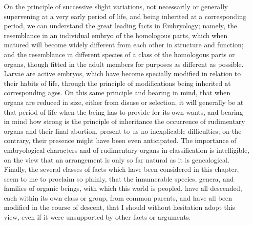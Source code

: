 \indent On the principle of successive slight variations, not necessarily or generally supervening at a very early period of life, and being inherited at a corresponding period, we can understand the great leading facts in Embryology; namely, the resemblance in an individual embryo of the homologous parts, which when matured will become widely different from each other in structure and function; and the resemblance in different species of a class of the homologous parts or organs, though fitted in the adult members for purposes as different as possible. Larvae are active embryos, which have become specially modified in relation to their habits of life, through the principle of modifications being inherited at corresponding ages. On this same principle and bearing in mind, that when organs are reduced in size, either from disuse or selection, it will generally be at that period of life when the being has to provide for its own wants, and bearing in mind how strong is the principle of inheritance the occurrence of rudimentary organs and their final abortion, present to us no inexplicable difficulties; on the contrary, their presence might have been even anticipated. The importance of embryological characters and of rudimentary organs in classification is intelligible, on the view that an arrangement is only so far natural as it is genealogical.~\\
\indent Finally, the several classes of facts which have been considered in this chapter, seem to me to proclaim so plainly, that the innumerable species, genera, and families of organic beings, with which this world is peopled, have all descended, each within its own class or group, from common parents, and have all been modified in the course of descent, that I should without hesitation adopt this view, even if it were unsupported by other facts or arguments.